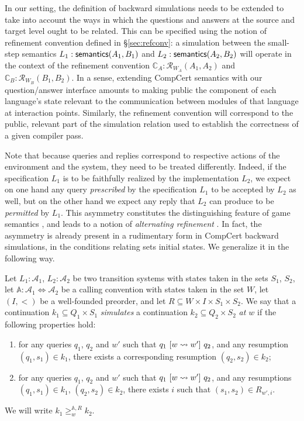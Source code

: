 In our setting,
the definition of backward simulations needs to be extended
to take into account the ways in which the questions and answers
at the source and target level ought to be related.
This can be specified using the notion of refinement convention
defined in \S\ref{sec:refconv}:
a simulation between the small-step semantics
$L_1 :  \mathsf{semantics} (A_1, B_1)$ and
$L_2 :  \mathsf{semantics} (A_2, B_2)$ will
operate in the context of the refinement convention
$\mathbb{C}_A : \mathcal{R}_{W_A}(A_1, A_2)$ and
$\mathbb{C}_B : \mathcal{R}_{W_B}(B_1, B_2)$.
In a sense,
extending CompCert semantics with our question/answer interface
amounts to making public the component of
each language's state relevant
to the communication between modules of that language
at interaction points.
Similarly,
the refinement convention will correspond to the public,
relevant part of the simulation relation used to establish
the correctness of a given compiler pass.

Note that because queries and replies
correspond to respective actions of the environment and the system,
they need to be treated differently.
Indeed,
if the specification $L_1$ is to be faithfully realized
by the implementation $L_2$,
we expect on one hand
any query \emph{prescribed} by the specification $L_1$
to be accepted by $L_2$ as well,
but on the other hand
we expect any reply that $L_2$ can produce
to be \emph{permitted} by $L_1$.
This asymmetry constitutes the distinguishing feature
of game semantics \cite{cspgs},
and leads to a notion of \emph{alternating refinement} \cite{altref}.
In fact,
the asymmetry is already present in a rudimentary form
in CompCert backward simulations,
in the conditions relating sets initial states.
We generalize it in the following way.

\begin{definition}
Let $L_1 : \mathcal{A}_1$, $L_2 : \mathcal{A}_2$
be two transition systems with states taken in the sets $S_1$, $S_2$,
let $\mathbb{A} : \mathcal{A}_1 \Leftrightarrow \mathcal{A}_2$
be a calling convention with states taken in the set $W$,
let $(I, <)$ be a well-founded preorder, and
let $R \subseteq W \times I \times S_1 \times S_2$.
We say that
a continuation $k_1 \subseteq Q_1 \times S_1$
\emph{simulates}
a continuation $k_2 \subseteq Q_2 \times S_2$
\emph{at $w$}
if the following properties hold:
\begin{enumerate}
\item
  for any queries $q_1$, $q_2$ and $w'$ such that
  $q_1 \ [{w \leadsto w'}]\  q_2$,
  and any resumption $(q_1, s_1) \in k_1$,
  there exists a corresponding resumption $(q_2, s_2) \in k_2$;
\item
  for any queries $q_1$, $q_2$ and $w'$ such that
  $q_1 \ [{w \leadsto w'}]\  q_2$,
  and any resumptions $(q_1, s_1) \in k_1$, $(q_2, s_2) \in k_2$,
  there exists $i$ such that $(s_1, s_2) \in R_{w',i}$.
\end{enumerate}
We will write $k_1 \ge^{\mathbb{A},R}_w k_2$.
\end{definition}

